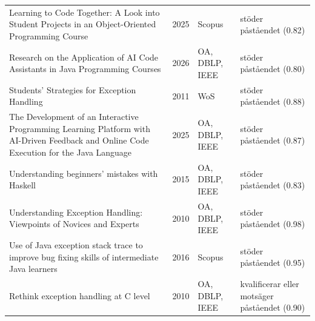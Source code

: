 \begin{longtable}{@{}%
  >{\raggedright\arraybackslash}p{}c%
  >{\raggedright\arraybackslash}p{}%
  >{\raggedright\arraybackslash}p{}@{}}
Learning to Code Together: A Look into Student Projects in an Object-Oriented Programming Course & 2025 & Scopus & stöder påståendet (0.82) \\
Research on the Application of AI Code Assistants in Java Programming Courses & 2026 & OA, DBLP, IEEE & stöder påståendet (0.80) \\
Students' Strategies for Exception Handling & 2011 & WoS & stöder påståendet (0.88) \\
The Development of an Interactive Programming Learning Platform with AI-Driven Feedback and Online Code Execution for the Java Language & 2025 & OA, DBLP, IEEE & stöder påståendet (0.87) \\
Understanding beginners' mistakes with Haskell & 2015 & OA, DBLP, IEEE & stöder påståendet (0.83) \\
Understanding Exception Handling: Viewpoints of Novices and Experts & 2010 & OA, DBLP, IEEE & stöder påståendet (0.98) \\
Use of Java exception stack trace to improve bug fixing skills of intermediate Java learners & 2016 & Scopus & stöder påståendet (0.95) \\
Rethink exception handling at C level & 2010 & OA, DBLP, IEEE & kvalificerar eller motsäger påståendet (0.90) \\
\end{longtable}
\endgroup
